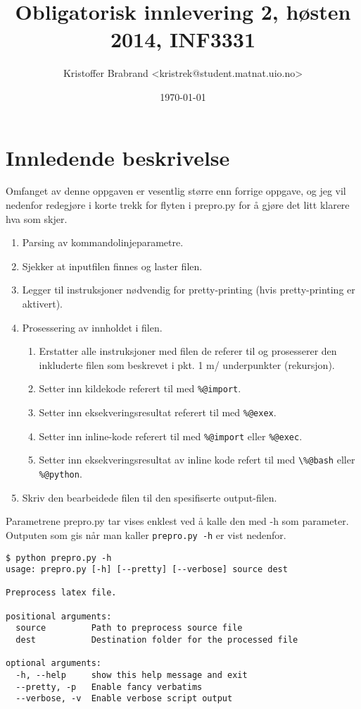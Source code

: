 \documentclass{article}
\title{Obligatorisk innlevering 2, høsten 2014, INF3331}
\author{Kristoffer Brabrand <kristrek@student.matnat.uio.no>}
\date{\today}
\begin{document}
\maketitle

\section*{Innledende beskrivelse}

Omfanget av denne oppgaven er vesentlig større enn forrige oppgave, og jeg vil nedenfor redegjøre i korte trekk for flyten i prepro.py for å gjøre det litt klarere hva som skjer.

\begin{enumerate}
  \item Parsing av kommandolinjeparametre.
  \item Sjekker at inputfilen finnes og laster filen.
  \item Legger til instruksjoner nødvendig for pretty-printing (hvis pretty-printing er aktivert).
  \item Prosessering av innholdet i filen.
  \begin{enumerate}
  	\item Erstatter alle \-instruksjoner med filen de referer til og prosesserer den inkluderte filen som beskrevet i pkt. 1 m/ underpunkter (rekursjon).
  	\item Setter inn kildekode referert til med \verb;%@import;.
  	\item Setter inn eksekveringsresultat referert til med \verb;%@exex;.
  	\item Setter inn inline-kode referert til med \verb;%@import; eller \verb;%@exec;.
  	\item Setter inn eksekveringsresultat av inline kode refert til med \verb;\%@bash; eller \verb;%@python;.
  \end{enumerate}
  \item Skriv den bearbeidede filen til den spesifiserte output-filen.
\end{enumerate}

Parametrene prepro.py tar vises enklest ved å kalle den med -h som parameter. Outputen som gis når man kaller \verb;prepro.py -h; er vist nedenfor.

\begin{Verbatim}[numbers=none,frame=lines,label=\fbox{{\tiny Terminal}},fontsize=\fontsize{9pt}{9pt},labelposition=topline,framesep=2.5mm,framerule=0.7pt]
$ python prepro.py -h
usage: prepro.py [-h] [--pretty] [--verbose] source dest

Preprocess latex file.

positional arguments:
  source         Path to preprocess source file
  dest           Destination folder for the processed file

optional arguments:
  -h, --help     show this help message and exit
  --pretty, -p   Enable fancy verbatims
  --verbose, -v  Enable verbose script output
\end{Verbatim}
\noindent
\end{document}
